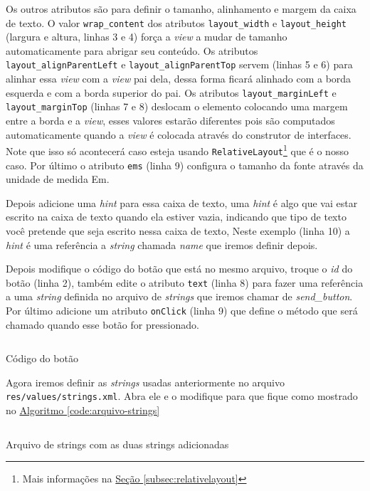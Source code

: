 \documentclass[a4paper,12pt,brazil,oneside]{book}
\begin{document}
\begin{singlespace}
Os outros atributos são para definir o tamanho, alinhamento e margem da caixa de texto. O valor \texttt{wrap\_content} dos atributos \texttt{layout\_width} e \texttt{layout\_height} (largura e altura, linhas 3 e 4) força a \emph{view} a mudar de tamanho automaticamente para abrigar seu conteúdo. Os atributos \texttt{layout\_alignParentLeft} e \texttt{layout\_alignParentTop} servem (linhas 5 e 6) para alinhar essa \emph{view} com a \emph{view} pai dela, dessa forma ficará alinhado com a borda esquerda e com a borda superior do pai. Os atributos \texttt{layout\_marginLeft} e \texttt{layout\_marginTop} (linhas 7 e 8) deslocam o elemento colocando uma margem entre a borda e a \emph{view}, esses valores estarão diferentes pois são computados automaticamente quando a \emph{view} é colocada através do construtor de interfaces. Note que isso só acontecerá caso esteja usando \texttt{RelativeLayout}\footnote{Mais informações na \hyperref[subsec:relativelayout]{Seção \ref*{subsec:relativelayout}}} que é o nosso caso. Por último o atributo \texttt{ems} (linha 9) configura o tamanho da fonte através da unidade de medida Em.

Depois adicione uma \textit{hint} para essa caixa de texto, uma \textit{hint} é algo que vai estar escrito na caixa de texto quando ela estiver vazia, indicando que tipo de texto você pretende que seja escrito nessa caixa de texto, Neste exemplo (linha 10) a \textit{hint} é uma referência a \emph{string} chamada \emph{name} que iremos definir depois.

Depois modifique o código do botão que está no mesmo arquivo, troque o \emph{id} do botão (linha 2), também edite o atributo \texttt{text} (linha 8) para fazer uma referência a uma \emph{string} definida no arquivo de \emph{strings} que iremos chamar de \emph{send\_button}. Por último adicione um atributo \texttt{onClick} (linha 9) que define o método que será chamado quando esse botão for pressionado.

\begin{listing}[H]
\inputminted[linenos=true,fontsize=\small,frame=lines, framesep=2mm, tabsize=2,numbersep=5pt]{xml}{src/firstapp/2.xml}
\caption{Código do botão}
\end{listing}

Agora iremos definir as \emph{strings} usadas anteriormente no arquivo \texttt{res/values/strings.xml}. Abra ele e o modifique para que fique como mostrado no 
\hyperref[code:arquivo-strings]{Algoritmo \ref*{code:arquivo-strings}}

\begin{listing}
\inputminted[linenos=true,fontsize=\small,frame=lines, framesep=2mm, tabsize=2,numbersep=5pt]{xml}{src/firstapp/3.xml}
\caption{Arquivo de strings com as duas strings adicionadas}
\label{code:arquivo-strings}
\end{listing}


\end{singlespace}
\end{document}
